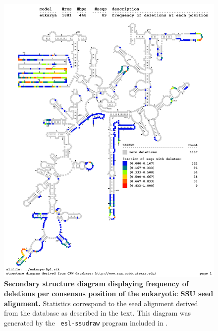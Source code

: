 \begin{figure}
\begin{center}
\includegraphics[width=5.5in]{../../seeds/ss-diagrams/eukarya-0p1-dall}
\end{center}
\caption[Secondary structure diagram displaying frequency of deletions
  per consensus position of the eukaryotic SSU seed
  alignment]{\textbf{Secondary structure diagram displaying frequency 
  of deletions per consensus position of the eukaryotic SSU seed
  alignment.} Statistics correspond to the  seed
  alignment derived from the  database \cite{CannoneGutell02}
  as described in the text. This diagram was generated by the {\tt
  esl-ssudraw} program included in .}
\label{fig:eukdel}
\end{figure}


